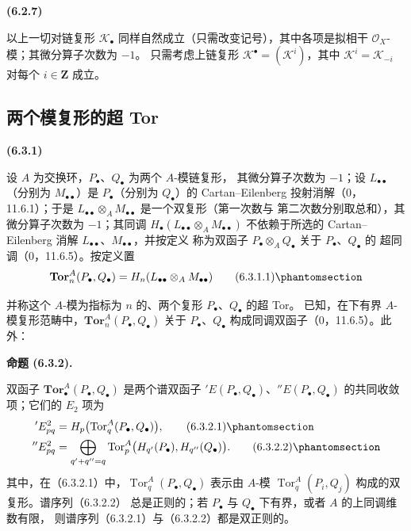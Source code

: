\documentclass[UTF8,fontset=none,11pt,oneside,openany]{ctexbook}
\newenvironment{env}[1][]{%
  \par\medskip\noindent\textbf{(#1)}\ %
}{\par}
\newenvironment{proposition}[1][]{%
  \par\medskip\noindent\textbf{命题 (#1).}\ %
}{\par}
\newcommand{\oldpage}[2][]{%
  \hypertarget{ega-source-page-#1-#2}{}%
  \marginnote{\scriptsize\textbf{#1}~|~#2}\ignorespaces}
\let\EGAOriginalLabel\label
\renewcommand{\label}[1]{\phantomsection\EGAOriginalLabel{#1}}
\begin{document}
\begin{env}[6.2.7]
以上一切对链复形 $\mathscr K_\bullet$ 同样自然成立（只需改变记号），其中各项是拟相干
$\mathscr O_X$-模；其微分算子次数为 $-1$。
只需考虑上链复形 $\mathscr K^\bullet=(\mathscr K^i)$，其中
$\mathscr K^i=\mathscr K_{-i}$ 对每个 $i\in\mathbf Z$ 成立。
\end{env}

\subsection{两个模复形的超 Tor}
\label{subsection:III.6.3.fr}

\begin{env}[6.3.1]
设 $A$ 为交换环，$P_\bullet$、$Q_\bullet$ 为两个 $A$-模链复形，
其微分算子次数为 $-1$；设 $L_{\bullet\bullet}$（分别为
$M_{\bullet\bullet}$）是 $P_\bullet$（分别为 $Q_\bullet$）的
Cartan--Eilenberg 投射消解（0，11.6.1）；于是
$L_{\bullet\bullet}\otimes_A M_{\bullet\bullet}$ 是一个双复形（第一次数与
第二次数分别取总和），其微分算子次数为 $-1$；其同调
$H_\bullet(L_{\bullet\bullet}\otimes_A M_{\bullet\bullet})$ 不依赖于所选的
Cartan--Eilenberg 消解 $L_{\bullet\bullet}$、$M_{\bullet\bullet}$，并按定义
称为双函子 $P_\bullet\otimes_A Q_\bullet$ 关于 $P_\bullet$、$Q_\bullet$ 的
超同调（0，11.6.5）。按定义置
\[
  \mathbf{Tor}_n^A(P_\bullet,Q_\bullet)
  =H_n(L_{\bullet\bullet}\otimes_A M_{\bullet\bullet})
  \tag{6.3.1.1}\label{III.6.3.1.1-fr}
\]

\oldpage[III]{142}

并称这个 $A$-模为指标为 $n$ 的、两个复形 $P_\bullet$、$Q_\bullet$ 的超 Tor。
已知，在下有界 $A$-模复形范畴中，$\mathbf{Tor}_n^A(P_\bullet,Q_\bullet)$
关于 $P_\bullet$、$Q_\bullet$ 构成同调双函子（0，11.6.5）。此外：
\end{env}

\begin{proposition}[6.3.2]
双函子 $\mathbf{Tor}_\bullet^A(P_\bullet,Q_\bullet)$ 是两个谱双函子
$'E(P_\bullet,Q_\bullet)$、$''E(P_\bullet,Q_\bullet)$ 的共同收敛项；它们的
$E_2$ 项为
\begin{align}
  'E^2_{pq}
    &=H_p\bigl(\operatorname{Tor}_q^A(P_\bullet,Q_\bullet)\bigr),
    \tag{6.3.2.1}\label{III.6.3.2.1-fr}\\
  ''E^2_{pq}
    &=\bigoplus_{q'+q''=q}
      \operatorname{Tor}_p^A\bigl(H_{q'}(P_\bullet),H_{q''}(Q_\bullet)\bigr).
    \tag{6.3.2.2}\label{III.6.3.2.2-fr}
\end{align}
其中，在（6.3.2.1）中，$\operatorname{Tor}_q^A(P_\bullet,Q_\bullet)$ 表示由
$A$-模 $\operatorname{Tor}_q^A(P_i,Q_j)$ 构成的双复形。谱序列（6.3.2.2）
总是正则的；若 $P_\bullet$ 与 $Q_\bullet$ 下有界，或者 $A$ 的上同调维数有限，
则谱序列（6.3.2.1）与（6.3.2.2）都是双正则的。
\end{proposition}
\end{document}
